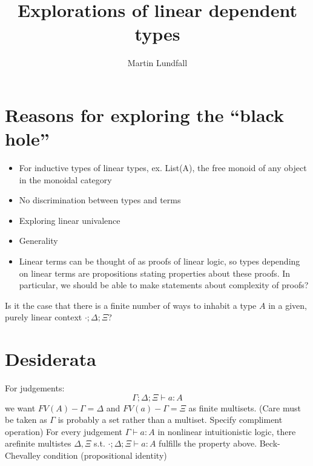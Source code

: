 
\usepackage[margin=0.5in]{geometry}

\title{Explorations of linear dependent types}
\author{Martin Lundfall}
\maketitle
\tableofcontents
\section{Reasons for exploring the ``black hole''}
\begin{itemize}
\item For inductive types of linear types, ex. List(A), the free monoid of any object in the monoidal category
\item No discrimination between types and terms
\item Exploring linear univalence
\item Generality
\item Linear terms can be thought of as proofs of linear logic, so types depending on linear terms are propositions stating properties about these proofs. In particular, we should be able to make statements about complexity of proofs?
\end{itemize}
Is it the case that there is a finite number of ways to inhabit a type $A$ in a given, purely linear context $\cdot; \Delta; \Xi$?
\section{Desiderata}
For judgements:
\[
\Gamma; \Delta; \Xi \vdash a : A
\]
we want $FV(A) - \Gamma = \Delta$ and $FV(a) - \Gamma = \Xi$ as finite multisets. (Care must be taken as $\Gamma$ is probably a set rather than a multiset. Specify compliment operation)
For every judgement $\Gamma \vdash a : A$ in nonlinear intuitionistic logic, there arefinite multistes $\Delta, \Xi$ s.t. $\cdot ; \Delta; \Xi \vdash a : A$ fulfills the property above.
Beck-Chevalley condition (propositional identity)
